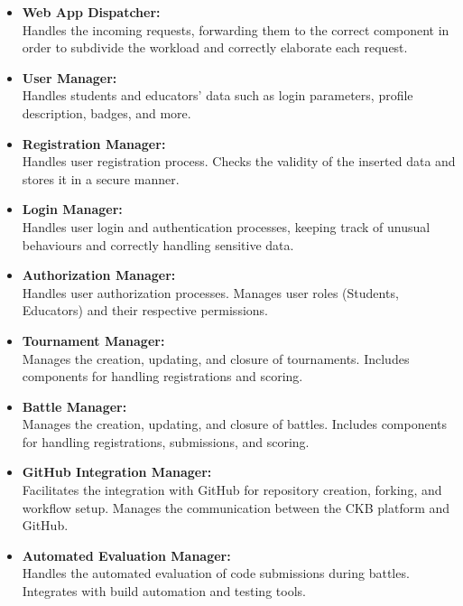 \begin{itemize}

    \item \textbf{Web App Dispatcher:} \\
Handles the incoming requests, forwarding them to the correct component in order to subdivide the workload and correctly elaborate each request.

    \item \textbf{User Manager:} \\
Handles students and educators' data such as login parameters, profile description, badges, and more.

    \item \textbf{Registration Manager:} \\
Handles user registration process. Checks the validity of the inserted data and stores it in a secure manner.

    \item \textbf{Login Manager:} \\
Handles user login and authentication processes, keeping track of unusual behaviours and correctly handling sensitive data.

    \item \textbf{Authorization Manager:} \\
Handles user authorization processes.
Manages user roles (Students, Educators) and their respective permissions.

    \item \textbf{Tournament Manager:}  \\
Manages the creation, updating, and closure of tournaments.
Includes components for handling registrations and scoring.

    \item \textbf{Battle Manager:}  \\
Manages the creation, updating, and closure of battles.
Includes components for handling registrations, submissions, and scoring.

    \item \textbf{GitHub Integration Manager:} \\
Facilitates the integration with GitHub for repository creation, forking, and workflow setup.
Manages the communication between the CKB platform and GitHub.

\item \textbf{Automated Evaluation Manager:}\\
Handles the automated evaluation of code submissions during battles.
Integrates with build automation and testing tools.


\end{itemize}
